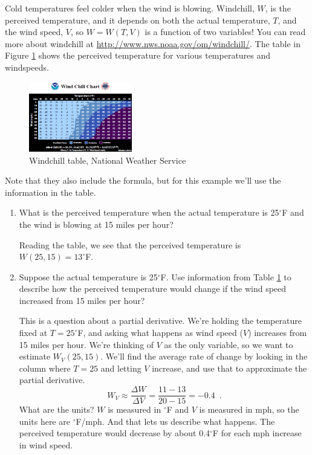 \begin{example}
Cold temperatures feel colder when the wind is blowing. Windchill, $W$, is the perceived temperature, and it depends on both the actual temperature, $T$, and the wind speed, $V$, so $W = W(T, V)$ is a function of two variables! You can read more about windchill at \url{http://www.nws.noaa.gov/om/windchill/}. The table in Figure \ref{fig:4-2-windchill} shows the perceived temperature for various temperatures and windspeeds.

\begin{figure}[!ht]
  \centering
    \includegraphics[width=0.4\textwidth]{img/chap4/image045.png}
    \caption{Windchill table, National Weather Service}
    \label{fig:4-2-windchill}
\end{figure}

Note that they also include the formula, but for this example we'll use the information in the table.
\begin{enumerate}
  \item What is the perceived temperature when the actual temperature is 25$^{\circ}$F and the wind is blowing at 15 miles per hour?

  \begin{solution}
    Reading the table, we see that the perceived temperature is $W(25, 15) = 13^{\circ}$F.
  \end{solution}
  \item Suppose the actual temperature is 25$^{\circ}$F. Use information from Table \ref{fig:4-2-windchill} to describe how the perceived temperature would change if the wind speed increased from 15 miles per hour?

  \begin{solution}
    This is a question about a partial derivative. We’re holding the temperature fixed at $T = 25^{\circ}$F, and asking what happens as wind speed ($V$) increases from 15 miles per hour. We’re thinking of $V$ as the only variable, so we want to estimate $W_V(25, 15)$. We'll find the average rate of change by looking in the column where $T=25$ and letting $V$ increase, and use that to approximate the partial derivative.
    $$W_V \approx  \frac{\Delta W}{\Delta V} = \frac{11-13}{20-15} = -0.4 \enspace .$$
    What are the units? $W$ is measured in $^{\circ}$F and $V$ is measured in mph, so the units here are $^{\circ}$F/mph. And that lets us describe what happens. The perceived temperature would decrease by about 0.4$^{\circ}$F for each mph increase in wind speed.
\end{solution}
\end{enumerate}
\end{example}

